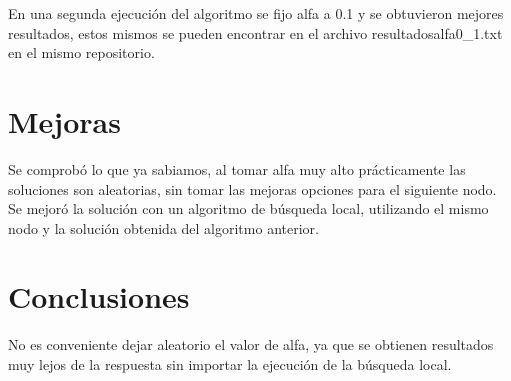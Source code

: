 \documentclass[12pt,a4paper]{article}
\begin{document}
En una segunda ejecución del algoritmo se fijo alfa a 0.1 y se obtuvieron mejores resultados, estos mismos se pueden encontrar en el archivo resultadosalfa0\_1.txt en el mismo repositorio.

\section{Mejoras}

Se comprobó lo que ya sabiamos, al tomar alfa muy alto prácticamente las soluciones son aleatorias, sin tomar las mejoras opciones para el siguiente nodo.
\newline Se mejoró la solución con un algoritmo de búsqueda local, utilizando el mismo nodo y la solución obtenida del algoritmo anterior.
\section{Conclusiones} 
No es conveniente dejar aleatorio el valor de alfa, ya que se obtienen resultados muy lejos de la respuesta sin importar la ejecución de la búsqueda local.
\newpage

\end{document}
